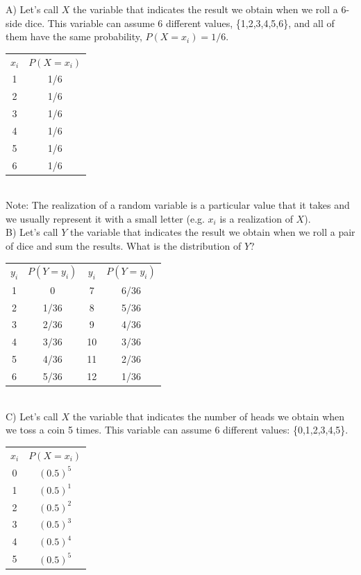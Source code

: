 \documentclass[11pt]{article}
\begin{document}
	A) Let's call $X$ the variable that indicates the result we obtain when we roll a 6-side dice. This variable can assume 6 different values, \{1,2,3,4,5,6\}, and all of them have the same probability, $P(X=x_i) = 1/6$.\newline\\
	\begin{tabular}{|c|c|}
\hline
	$x_i$ & $P(X=x_i)$\\
	\cline{1-2}
	1 & 1/6\\
	2 & 1/6\\
	3 & 1/6\\
	4 & 1/6\\
	5 & 1/6\\
	6 & 1/6\\

\hline
\end{tabular}\newline\\

Note: The realization of a random variable is a particular value that it takes and we usually represent it with a small letter (e.g. $x_i$ is a realization of $X$).\\

	B) Let's call $Y$ the variable that indicates the result we obtain when we roll a pair of dice and sum the results. What is the distribution of $Y$?\\
	
	\begin{tabular}{|c|c|c|c|}
\hline
	$y_i$ & $P(Y=y_i)$ & $y_i$ & $P(Y=y_i)$\\
	\cline{1-4}
	1 & 0 & 7 & 6/36\\
	2 & 1/36 & 8 & 5/36\\
	3 & 2/36 & 9 & 4/36\\
	4 & 3/36 & 10 & 3/36\\
	5 & 4/36 & 11 & 2/36\\
	6 & 5/36 & 12 & 1/36\\
\hline
\end{tabular}\newline\\

	C) Let's call $X$ the variable that indicates the number of heads we obtain when we toss a coin 5 times. This variable can assume 6 different values: \{0,1,2,3,4,5\}.\\
	
	\begin{tabular}{|c|c|}
\hline
	$x_i$ & $P(X=x_i)$\\
	\cline{1-2}
	0 & $(0.5)^5$\\
	1 & $(0.5)^1$\\
	2 & $(0.5)^2$\\
	3 & $(0.5)^3$\\
	4 & $(0.5)^4$\\
	5 & $(0.5)^5$\\
\hline
\end{tabular}
\end{document}
